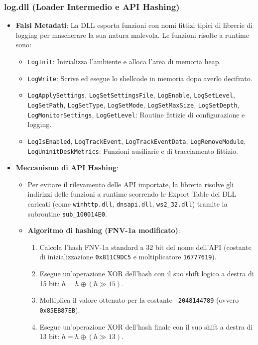 \subsubsection{log.dll (Loader Intermedio e API Hashing)}
\begin{itemize}
  \item \textbf{Falsi Metadati}: La DLL esporta funzioni con nomi fittizi tipici di librerie di logging per mascherare la sua natura malevola. Le funzioni risolte a runtime sono:
  \begin{itemize}
    \item \texttt{LogInit}: Inizializza l'ambiente e alloca l'area di memoria heap.
    \item \texttt{LogWrite}: Scrive ed esegue lo shellcode in memoria dopo averlo decifrato.
    \item \texttt{LogApplySettings}, \texttt{LogSetSettingsFile}, \texttt{LogEnable}, \texttt{LogSetLevel}, \texttt{LogSetPath}, \texttt{LogSetType}, \texttt{LogSetMode}, \texttt{LogSetMaxSize}, \texttt{LogSetDepth}, \texttt{LogMonitorSettings}, \texttt{LogGetLevel}: Routine fittizie di configurazione e logging.
    \item \texttt{LogIsEnabled}, \texttt{LogTrackEvent}, \texttt{LogTrackEventData}, \texttt{LogRemoveModule}, \texttt{LogUninitDeskMetrics}: Funzioni ausiliarie e di tracciamento fittizio.
  \end{itemize}
  \item \textbf{Meccanismo di API Hashing}:
  \begin{itemize}
    \item Per evitare il rilevamento delle API importate, la libreria risolve gli indirizzi delle funzioni a runtime scorrendo le Export Table dei DLL caricati (come \texttt{winhttp.dll}, \texttt{dnsapi.dll}, \texttt{ws2\_32.dll}) tramite la subroutine \texttt{sub\_100014E0}.
    \item \textbf{Algoritmo di hashing (FNV-1a modificato)}:
    \begin{enumerate}
      \item Calcola l'hash FNV-1a standard a 32 bit del nome dell'API (costante di inizializzazione \texttt{0x811C9DC5} e moltiplicatore \texttt{16777619}).
      \item Esegue un'operazione XOR dell'hash con il suo shift logico a destra di 15 bit: $h = h \oplus (h \gg 15)$.
      \item Moltiplica il valore ottenuto per la costante \texttt{-2048144789} (ovvero \texttt{0x85EB87EB}).
      \item Esegue un'operazione XOR dell'hash finale con il suo shift a destra di 13 bit: $h = h \oplus (h \gg 13)$.

\end{enumerate}
\end{itemize}
\end{itemize}
